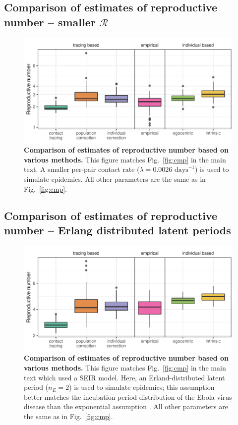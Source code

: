 \documentclass[12pt]{article}
\newcommand{\fref}[1]{Fig.~\ref{fig:#1}}
\newcommand{\RR}{\ensuremath{{\mathcal R}}}
\begin{document}
\subsection{Comparison of estimates of reproductive number -- smaller $\RR$}

\begin{figure}[!h]
\includegraphics[width=\textwidth]{../fig/cmp_reproductive_small.pdf}
\caption{\textbf{Comparison of estimates of reproductive number based on various methods.}
This figure matches \fref{cmp} in the main text.
A smaller per-pair contact rate ($\lambda = 0.0026 \textrm{ days}^{-1}$) is used to simulate epidemics.
All other parameters are the same as in \fref{cmp}.
}
\label{fig:cmpsmall}
\end{figure}

\pagebreak

\subsection{Comparison of estimates of reproductive number -- Erlang distributed latent periods}

\begin{figure}[!h]
\includegraphics[width=\textwidth]{../fig/cmp_reproductive_seminr.pdf}
\caption{\textbf{Comparison of estimates of reproductive number based on various methods.}
This figure matches \fref{cmp} in the main text which used a SEIR model.
Here, an Erland-distributed latent period ($n_E=2$) is used to simulate epidemics; this assumption better matches the incubation period distribution of the Ebola virus disease than the exponential assumption \citep{who2014ebola}.
All other parameters are the same as in \fref{cmp}.
}
\label{fig:cmpseminir}
\end{figure}
\end{document}
